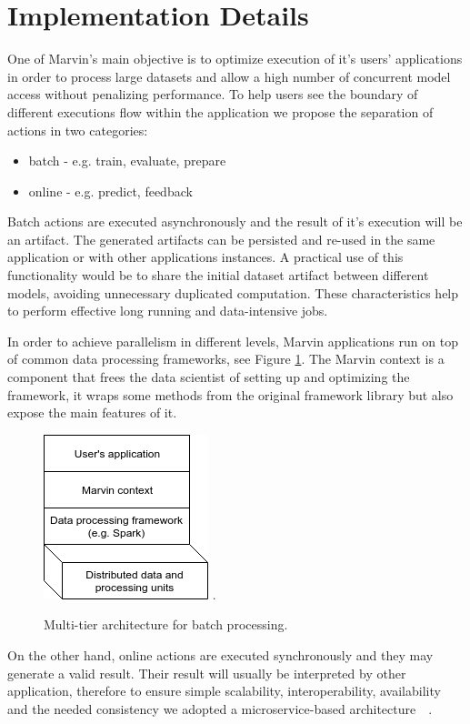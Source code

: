 \documentclass[twoside,11pt]{article}
\begin{document}
\section{Implementation Details}

One of Marvin's main objective is to optimize execution of it's users' applications in order to process large datasets and allow a high number of concurrent model access without penalizing performance. To help users see the boundary of different executions flow within the application we propose the separation of actions in two categories:
\begin{itemize}
    \item batch - e.g. train, evaluate, prepare
    \item online - e.g. predict, feedback
\end{itemize}

Batch actions are executed asynchronously and the result of it's execution will be an artifact. The generated artifacts can be persisted and re-used in the same application or with other applications instances. A practical use of this functionality would be to share the initial dataset artifact between different models, avoiding unnecessary duplicated computation. These characteristics help to perform effective long running and data-intensive jobs. 

In order to achieve parallelism in different levels, Marvin applications run on top of common data processing frameworks, see Figure \ref{fig_spark}. The Marvin context is a component that frees the data scientist of setting up and optimizing the framework, it wraps some methods from the original framework library but also expose the main features of it.
\begin{figure}[h]
\centering
\includegraphics[scale=0.7]{fig/marvin-spark.png}
\DeclareGraphicsExtensions.
\caption{Multi-tier architecture for batch processing.}
\label{fig_spark}
\end{figure}

On the other hand, online actions are executed synchronously and they may generate a valid result. Their result will usually be interpreted by other application, therefore to ensure simple scalability, interoperability, availability and the needed consistency we adopted a microservice-based architecture~\citep{brewer2000towards}~\citep{fowler2014microservices}. 
\end{document}
